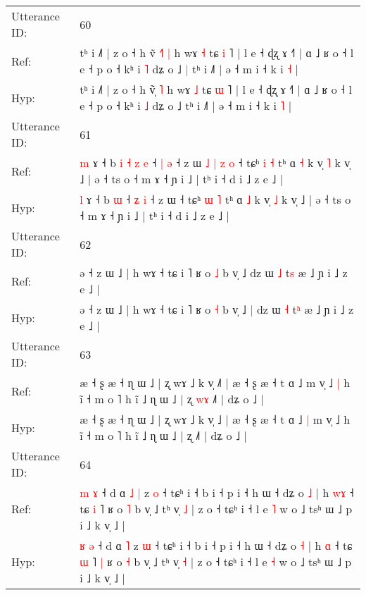 \documentclass[10pt]{article}
\DeclareRobustCommand{\hl}[1]{{\textcolor{red}{#1}}}
\begin{document}
\begin{longtable}{ll}
 \\
\midrule
Utterance ID: & 60 \\
Ref: & tʰ i ˩˥ | z o ˧ h ṽ\hl{ }\hl{˧}\hl{˥} \hl{|} h wɤ \hl{˧} tɕ \hl{i} ˥ | l e ˧ ɖʐ ɤ ˧˥ | ɑ ˩ ʁ o ˧ l e ˧ p o ˧ kʰ i \hl{˥} dʑ o ˩\hl{ }\hl{|} tʰ i ˩˥ | ə ˧ m i ˧ k i \hl{˧} |
 \\
Hyp: & tʰ i ˩˥ | z o ˧ h ṽ\hl{}\hl{}\hl{̩} \hl{˥} h wɤ \hl{˩} tɕ \hl{ɯ} ˥ | l e ˧ ɖʐ ɤ ˧˥ | ɑ ˩ ʁ o ˧ l e ˧ p o ˧ kʰ i \hl{˩} dʑ o ˩\hl{}\hl{} tʰ i ˩˥ | ə ˧ m i ˧ k i \hl{˥} |
 \\
\midrule
Utterance ID: & 61 \\
Ref: & \hl{m} ɤ ˧ b\hl{ }\hl{i}\hl{ }\hl{˧}\hl{ }\hl{z} \hl{e} ˧ \hl{|} \hl{ə} ˧ z ɯ\hl{ }\hl{˩}\hl{ }\hl{|}\hl{ }\hl{z}\hl{ }\hl{o} ˧ tɕʰ \hl{i} \hl{˧} tʰ ɑ \hl{˧} k v̩ \hl{˥} k v̩ ˩ | ə ˧ ts o ˧ m ɤ ˧ ɲ i ˩ | tʰ i ˧ d i ˩ z e ˩ |
 \\
Hyp: & \hl{l} ɤ ˧ b\hl{}\hl{}\hl{}\hl{}\hl{}\hl{} \hl{ɯ} ˧ \hl{ʑ} \hl{i} ˧ z ɯ\hl{}\hl{}\hl{}\hl{}\hl{}\hl{}\hl{}\hl{} ˧ tɕʰ \hl{ɯ} \hl{˥} tʰ ɑ \hl{˩} k v̩ \hl{˩} k v̩ ˩ | ə ˧ ts o ˧ m ɤ ˧ ɲ i ˩ | tʰ i ˧ d i ˩ z e ˩ |
 \\
\midrule
Utterance ID: & 62 \\
Ref: & ə ˧ z ɯ ˩ | h wɤ ˧ tɕ i ˥ ʁ o \hl{˩} b v̩ ˩\hl{}\hl{} dz ɯ \hl{˩} t\hl{s} æ ˩ ɲ i ˩ z e ˩ |
 \\
Hyp: & ə ˧ z ɯ ˩ | h wɤ ˧ tɕ i ˥ ʁ o \hl{˧} b v̩ ˩\hl{ }\hl{|} dz ɯ \hl{˧} t\hl{ʰ} æ ˩ ɲ i ˩ z e ˩ |
 \\
\midrule
Utterance ID: & 63 \\
Ref: & æ ˧ ʂ æ ˧ ɳ ɯ ˩ | ʐ wɤ ˩ k v̩ ˩\hl{˥} | æ ˧ ʂ æ ˧ t ɑ ˩\hl{}\hl{} m v̩ ˩\hl{ }\hl{|} h ĩ ˧ m o ˥ h ĩ ˩ ɳ ɯ ˩ | ʐ\hl{ }\hl{w}\hl{ɤ} ˩˥ | dʑ o ˩ |
 \\
Hyp: & æ ˧ ʂ æ ˧ ɳ ɯ ˩ | ʐ wɤ ˩ k v̩ ˩\hl{} | æ ˧ ʂ æ ˧ t ɑ ˩\hl{ }\hl{|} m v̩ ˩\hl{}\hl{} h ĩ ˧ m o ˥ h ĩ ˩ ɳ ɯ ˩ | ʐ\hl{}\hl{}\hl{} ˩˥ | dʑ o ˩ |
 \\
\midrule
Utterance ID: & 64 \\
Ref: & \hl{m} \hl{ɤ} ˧ d ɑ\hl{ }\hl{˩} \hl{|} z \hl{o} ˧ tɕʰ i ˧ b i ˧ p i ˧ h ɯ ˧ dʑ o \hl{˩} | h \hl{w}\hl{ɤ} ˧ tɕ \hl{i} ˥\hl{}\hl{} ʁ o \hl{˥} b v̩ ˩ tʰ v̩ \hl{˩} | z o ˧ tɕʰ i ˧ l e \hl{˥} w o ˩ tsʰ ɯ ˩ p i ˩ k v̩ ˩ |
 \\
Hyp: & \hl{ʁ} \hl{ə} ˧ d ɑ\hl{}\hl{} \hl{˥} z \hl{ɯ} ˧ tɕʰ i ˧ b i ˧ p i ˧ h ɯ ˧ dʑ o \hl{˧} | h \hl{}\hl{ɑ} ˧ tɕ \hl{ɯ} ˥\hl{ }\hl{|} ʁ o \hl{˧} b v̩ ˩ tʰ v̩ \hl{˧} | z o ˧ tɕʰ i ˧ l e \hl{˧} w o ˩ tsʰ ɯ ˩ p i ˩ k v̩ ˩ |
 \\
\midrule

\end{longtable}
\end{document}
